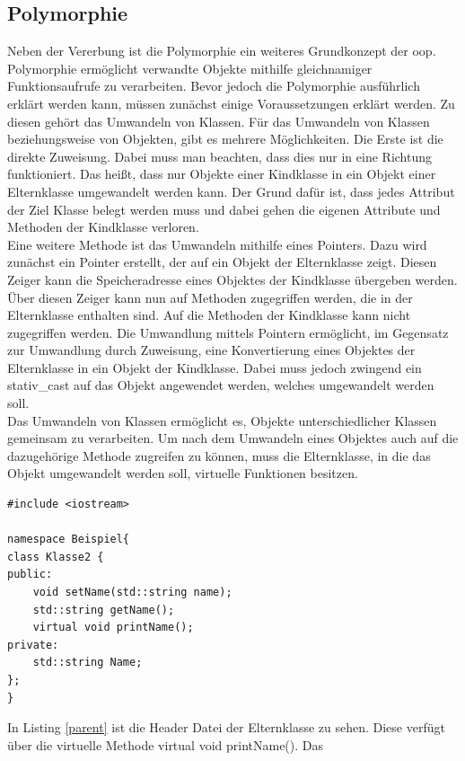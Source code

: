 \subsection{Polymorphie}\label{poly}
Neben der Vererbung ist die Polymorphie ein weiteres Grundkonzept der \ac{oop}. Polymorphie ermöglicht verwandte Objekte mithilfe gleichnamiger Funktionsaufrufe zu verarbeiten. Bevor jedoch die Polymorphie ausführlich erklärt werden kann, müssen zunächst einige Voraussetzungen erklärt werden.
Zu diesen gehört das Umwandeln von Klassen. Für das Umwandeln von  Klassen beziehungsweise von Objekten, gibt es mehrere Möglichkeiten. Die Erste ist die direkte Zuweisung. Dabei muss man beachten, dass dies nur in eine Richtung funktioniert. Das heißt, dass nur Objekte einer Kindklasse in ein Objekt einer Elternklasse umgewandelt werden kann. Der Grund dafür ist, dass jedes Attribut der Ziel Klasse belegt werden muss und dabei gehen die eigenen  Attribute und Methoden  der Kindklasse verloren.\\
Eine weitere Methode ist das Umwandeln mithilfe eines Pointers.
Dazu wird zunächst ein Pointer erstellt, der auf ein Objekt der Elternklasse zeigt. Diesen Zeiger kann die Speicheradresse eines Objektes der Kindklasse übergeben werden. Über diesen Zeiger kann nun auf Methoden zugegriffen werden, die in der Elternklasse enthalten sind. Auf die Methoden der Kindklasse kann nicht zugegriffen werden. Die Umwandlung mittels Pointern ermöglicht, im Gegensatz zur Umwandlung durch Zuweisung, eine Konvertierung eines Objektes der Elternklasse in ein Objekt der Kindklasse. Dabei muss jedoch zwingend ein \glqq stativ\_cast\grqq{} auf das Objekt angewendet werden, welches umgewandelt werden soll. \\
Das Umwandeln von Klassen ermöglicht es, Objekte unterschiedlicher Klassen gemeinsam zu verarbeiten. 
Um nach dem Umwandeln eines Objektes auch auf die dazugehörige Methode zugreifen zu können, muss die Elternklasse, in die das Objekt umgewandelt werden soll, virtuelle Funktionen besitzen. 
\newpage
\begin{lstlisting}[caption = Klasse2.h,label=parent]
#include <iostream>

namespace Beispiel{
class Klasse2 {
public:
	void setName(std::string name);
	std::string getName();
	virtual void printName();
private:
	std::string Name;
};
}
\end{lstlisting}
In Listing  \ref{parent} ist die Header Datei der Elternklasse zu sehen. Diese verfügt über die virtuelle Methode \glqq virtual void printName()\grqq{}. Das 
